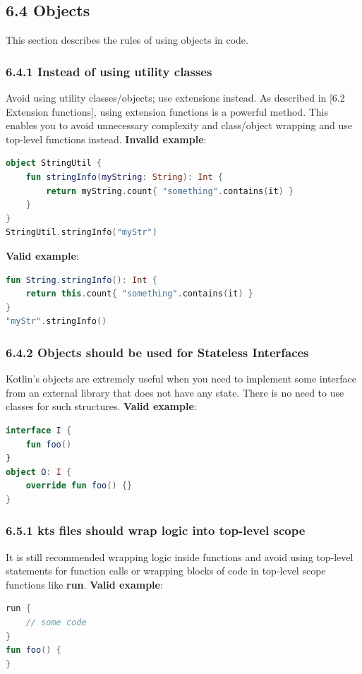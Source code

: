 \subsection*{\textbf{6.4 Objects}}
\label{sec:6.4}
This section describes the rules of using objects in code.
\subsubsection*{\textbf{6.4.1 Instead of using utility classes}}
\leavevmode\newline
\label{sec:6.4.1}
Avoid using utility classes/objects; use extensions instead. As described in [6.2 Extension functions], using extension functions is a powerful method.
This enables you to avoid unnecessary complexity and class/object wrapping and use top-level functions instead.
\textbf{Invalid example}:
\begin{lstlisting}[language=Kotlin]
object StringUtil {
    fun stringInfo(myString: String): Int {
        return myString.count{ "something".contains(it) }
    }
}
StringUtil.stringInfo("myStr")
\end{lstlisting}
\textbf{Valid example}:
\begin{lstlisting}[language=Kotlin]
fun String.stringInfo(): Int {
    return this.count{ "something".contains(it) }
}
"myStr".stringInfo()
\end{lstlisting}
\subsubsection*{\textbf{6.4.2 Objects should be used for Stateless Interfaces}}
\leavevmode\newline
\label{sec:6.4.2}
Kotlin’s objects are extremely useful when you need to implement some interface from an external library that does not have any state.
There is no need to use classes for such structures.
\textbf{Valid example}:
\begin{lstlisting}[language=Kotlin]
interface I {
    fun foo()
}
object O: I {
    override fun foo() {}
}
\end{lstlisting}
\subsubsection*{\textbf{6.5.1 kts files should wrap logic into top-level scope}}
\leavevmode\newline
\label{sec:6.5.1}
It is still recommended wrapping logic inside functions and avoid using top-level statements for function calls or wrapping blocks of code
in top-level scope functions like \textbf{run}.
\textbf{Valid example}:
\begin{lstlisting}[language=Kotlin]
run {
    // some code
}
fun foo() {
}
\end{lstlisting}